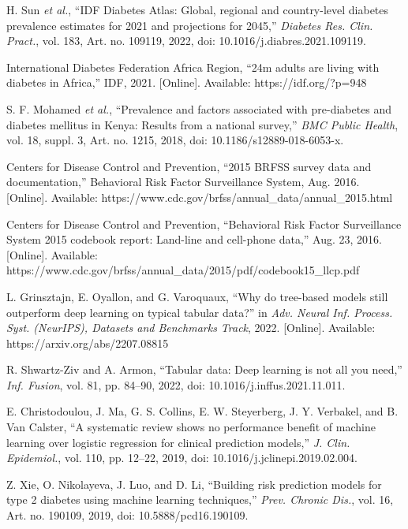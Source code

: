  H. Sun \emph{et al.}, ``IDF Diabetes Atlas: Global, regional and country-level diabetes prevalence estimates for 2021 and projections for 2045,'' \emph{Diabetes Res. Clin. Pract.}, vol. 183, Art. no. 109119, 2022, doi: 10.1016/j.diabres.2021.109119.

 International Diabetes Federation Africa Region, ``24m adults are living with diabetes in Africa,'' IDF, 2021. [Online]. Available: https://idf.org/?p=948

 S. F. Mohamed \emph{et al.}, ``Prevalence and factors associated with pre-diabetes and diabetes mellitus in Kenya: Results from a national survey,'' \emph{BMC Public Health}, vol. 18, suppl. 3, Art. no. 1215, 2018, doi: 10.1186/s12889-018-6053-x.

 Centers for Disease Control and Prevention, ``2015 BRFSS survey data and documentation,'' Behavioral Risk Factor Surveillance System, Aug. 2016. [Online]. Available: https://www.cdc.gov/brfss/annual\_data/annual\_2015.html

 Centers for Disease Control and Prevention, ``Behavioral Risk Factor Surveillance System 2015 codebook report: Land-line and cell-phone data,'' Aug. 23, 2016. [Online]. Available: https://www.cdc.gov/brfss/annual\_data/2015/pdf/codebook15\_llcp.pdf

 L. Grinsztajn, E. Oyallon, and G. Varoquaux, ``Why do tree-based models still outperform deep learning on typical tabular data?'' in \emph{Adv. Neural Inf. Process. Syst. (NeurIPS), Datasets and Benchmarks Track}, 2022. [Online]. Available: https://arxiv.org/abs/2207.08815

 R. Shwartz-Ziv and A. Armon, ``Tabular data: Deep learning is not all you need,'' \emph{Inf. Fusion}, vol. 81, pp. 84--90, 2022, doi: 10.1016/j.inffus.2021.11.011.

 E. Christodoulou, J. Ma, G. S. Collins, E. W. Steyerberg, J. Y. Verbakel, and B. Van Calster, ``A systematic review shows no performance benefit of machine learning over logistic regression for clinical prediction models,'' \emph{J. Clin. Epidemiol.}, vol. 110, pp. 12--22, 2019, doi: 10.1016/j.jclinepi.2019.02.004.

 Z. Xie, O. Nikolayeva, J. Luo, and D. Li, ``Building risk prediction models for type 2 diabetes using machine learning techniques,'' \emph{Prev. Chronic Dis.}, vol. 16, Art. no. 190109, 2019, doi: 10.5888/pcd16.190109.

